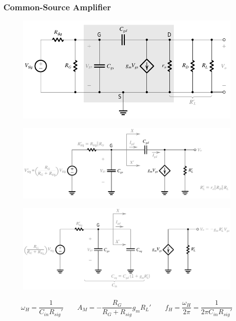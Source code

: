 \subsubsection{Common-Source Amplifier}

\begin{figure}[H]
  \centering
  \includegraphics[width=0.9\linewidth]{figures/Frequency-Response-CS-High-1}
\end{figure}

\begin{figure}[H]
  \centering
  \includegraphics[width=0.9\linewidth]{figures/Frequency-Response-CS-High-2}
\end{figure}

\begin{figure}[H]
  \centering
  \includegraphics[width=\linewidth]{figures/Frequency-Response-CS-High-3}
\end{figure}

\begin{equation*}
  \begin{aligned}
    \omega_H = \dfrac{1}{C_{in} R_{sig}'} \quad\quad A_M = - \dfrac{R_G}{R_G + R_{sig}} g_m R_L' \quad\quad f_H = \dfrac{\omega_H}{2 \pi} = \dfrac{1}{2 \pi C_{in} R_{sig}'}   
  \end{aligned}
\end{equation*}

